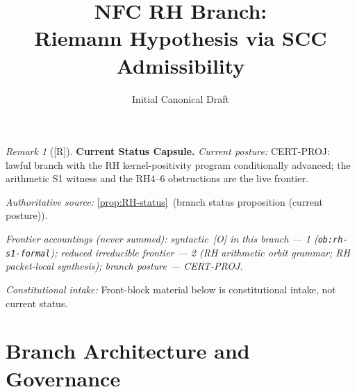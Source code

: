 \documentclass[12pt,oneside]{amsbook}
\theoremstyle{plain}
\theoremstyle{definition}
\theoremstyle{remark}
\newtheorem{remark}[theorem]{Remark}
\newcommand{\status}[1]{\textup{[#1]}}
\begin{document}
\title{NFC RH Branch:\\
 Riemann Hypothesis via SCC Admissibility}
\date{Initial Canonical Draft}
\maketitle
\tableofcontents


\begin{remark}[\status{R}]\label{cap:RH-status}
\textbf{Current Status Capsule.}
\emph{Current posture:} CERT-PROJ: lawful branch with the RH kernel-positivity program conditionally advanced; the arithmetic S1 witness and the RH4--6 obstructions are the live frontier.

\emph{Authoritative source:} \ref{prop:RH-status}~(branch status proposition (current posture)).

\emph{Frontier accountings (never summed): syntactic~[O] in this branch --- 1 (\texttt{ob:rh-s1-formal}); reduced irreducible frontier --- 2 (RH arithmetic orbit grammar; RH packet-local synthesis); branch posture --- CERT-PROJ.}

\emph{Constitutional intake:} Front-block material below is constitutional intake, not current status.
\end{remark}

\section{Branch Architecture and Governance}
\label{sec:rh-architecture}
\end{document}
